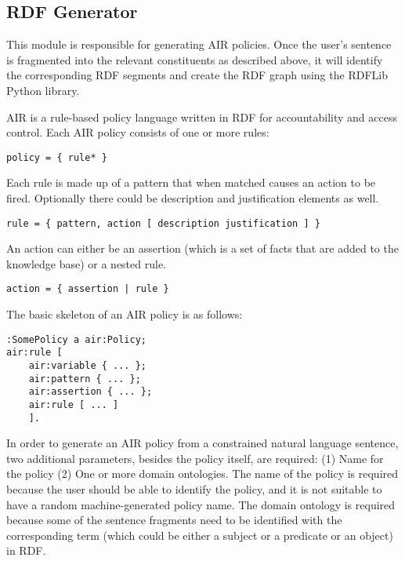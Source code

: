 \documentclass{llncs}
\begin{document}

\subsection{RDF Generator}

This module is responsible for generating AIR \cite{air} policies. Once the user's sentence is fragmented into the relevant constituents as described above, it will identify the corresponding RDF segments and create the RDF graph using the RDFLib \cite{rdflib} Python library.

AIR is a rule-based policy language written in RDF for accountability and access control. Each AIR policy consists of one or more rules:

\begin{verbatim}
policy = { rule* } 
\end{verbatim}

Each rule is made up of a pattern that when matched causes an action to be fired. Optionally there could be description and justification elements as well.

\begin{verbatim}
rule = { pattern, action [ description justification ] } 
\end{verbatim}

An action can either be an assertion (which is a set of facts that are added to the knowledge base) or a nested rule.

\begin{verbatim}
action = { assertion | rule } 
\end{verbatim}

The basic skeleton of an AIR policy is as follows:

\begin{verbatim}
:SomePolicy a air:Policy;
air:rule [
	air:variable { ... };
	air:pattern { ... };
	air:assertion { ... };
	air:rule [ ... ]
	].
\end{verbatim}
	 		
In order to generate an AIR policy from a constrained natural language sentence, two additional parameters, besides the policy itself, are required: (1) Name for the policy (2) One or more domain ontologies. The name of the policy is required because the user should be able to identify the policy, and it is not suitable to have a random machine-generated policy name. The domain ontology is required because some of the sentence fragments need to be identified with the corresponding term (which could be either a subject or a predicate or an object) in RDF.
\end{document}
